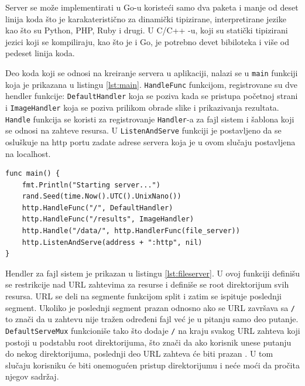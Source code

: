 \documentclass[12pt,oneside]{memoir}
\begin{document}
Server se može implementirati u Go-u  koristeći samo dva paketa i manje od deset linija koda što je karakateristično za dinamički tipizirane, interpretirane jezike kao što su Python, PHP, Ruby i drugi. U C/C++ -u, koji su statički tipizirani jezici koji se kompiliraju, kao što je i Go, je potrebno devet bibiloteka i više od pedeset linija koda.\cite{server}

Deo koda koji se odnosi na kreiranje servera u aplikaciji, nalazi se u \texttt{main} funkciji koja je prikazana u listingu \ref{lst:main}. \texttt{HandleFunc} funkcijom, registrovane su dve hendler funkcije: \texttt{DefaultHandler} koja se poziva kada se pristupa početnoj strani i \texttt{ImageHandler} koja se poziva prilikom obrade slike i prikazivanja rezultata. \texttt{Handle} funkcija se koristi za registrovanje \texttt{Handler}-a za fajl sistem i šablona koji se odnosi na zahteve resursa.  U \texttt{ListenAndServe} funkciji je postavljeno da se osluškuje na http portu zadate adrese servera koja je u ovom slučaju postavljena na localhost.

\begin{center}
\begin{lstlisting}[caption={Funkcija \texttt{main}, kreiranje servera},label={lst:main},  backgroundcolor=\color{background},belowskip=-0.7 \baselineskip ]
func main() {
	fmt.Println("Starting server...")
	rand.Seed(time.Now().UTC().UnixNano())
	http.HandleFunc("/", DefaultHandler)
	http.HandleFunc("/results", ImageHandler)
	http.Handle("/data/", http.HandlerFunc(file_server))
	http.ListenAndServe(address + ":http", nil)
}
\end{lstlisting}
\end{center}

\label{fileserver}Hendler za fajl sistem je prikazan u listingu \ref{lst:fileserver}. U ovoj funkciji definišu se restrikcije nad URL zahtevima za resurse i definiše se root direktorijum svih resursa. URL se deli na segmente funkcijom split i zatim se ispituje poslednji segment. Ukoliko je poslednji segment prazan odnosno ako se URL završava sa \texttt{/} to znači da u zahtevu nije tražen određeni fajl već je u pitanju samo deo putanje. \texttt{DefaultServeMux} funkcioniše tako što dodaje \texttt{/} na kraju svakog URL zahteva koji postoji u podstablu root direktorijuma, što znači da ako korisnik unese putanju do nekog direktorijuma, poslednji deo URL zahteva će biti prazan \cite{http}. U tom slučaju korisniku će biti onemogućen pristup direktorijumu i neće moći da pročita njegov sadržaj.
\end{document}
